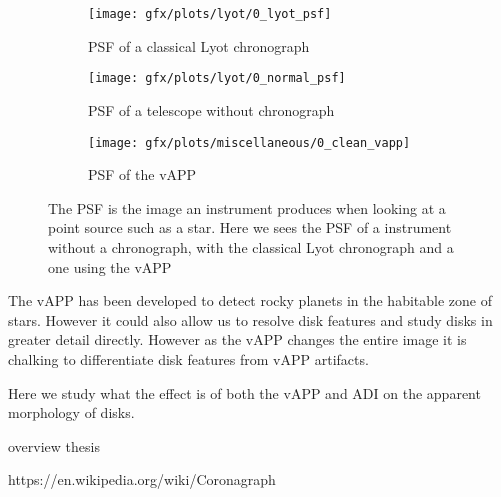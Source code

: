 \begin{figure}[h!]
      \begin{subfigure}[t]{0.5 \textwidth}
        \texttt{[image: gfx/plots/lyot/0\_lyot\_psf]}
        \label{fig:lyot}
        \caption{PSF of a classical Lyot chronograph}
      \end{subfigure}%
      \begin{subfigure}[t]{0.5\textwidth}
        \texttt{[image: gfx/plots/lyot/0\_normal\_psf]}
        \caption{PSF of a telescope without chronograph}
      \end{subfigure}
      
      \begin{subfigure}[]{0.5\textwidth}
        \texttt{[image: gfx/plots/miscellaneous/0\_clean\_vapp]}
        \caption{PSF of the vAPP}
      \end{subfigure}
      
  \caption{The \ac{PSF} is the image an instrument produces when looking at a point source such as a star. Here we sees the \ac{PSF} of a instrument without a chronograph, with the classical Lyot chronograph and a one using the vAPP }
  \label{fig:vapp_vs_lyot}
\end{figure}

The \ac{vAPP} has been developed to detect rocky planets in the habitable zone of stars. However it could also allow us to resolve disk features and study disks in greater detail directly. However as the \ac{vAPP} changes the entire image it is chalking to differentiate disk features from \ac{vAPP} artifacts. 

Here we study what the effect is of both the \ac{vAPP} and \ac{ADI} on the apparent morphology of disks.


overview thesis


https://en.wikipedia.org/wiki/Coronagraph
